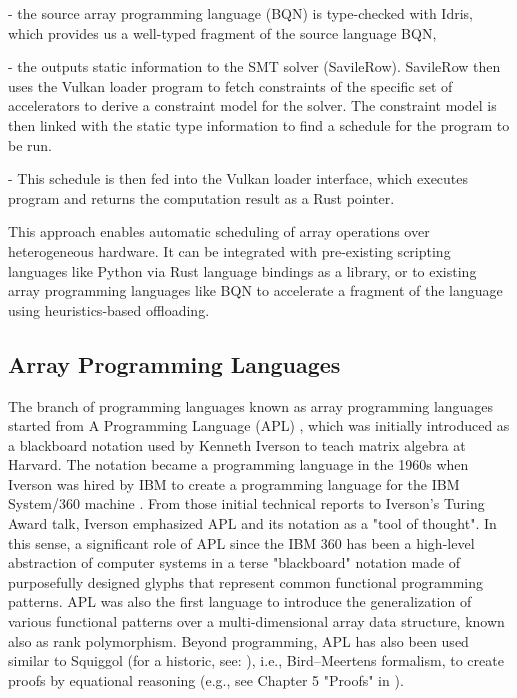 \documentclass[10pt,a4paper]{article}
\begin{document}
- the source array programming language (BQN) is type-checked with Idris, which provides us a well-typed fragment of the source language BQN,

- the outputs static information to the SMT solver (SavileRow). SavileRow then uses the Vulkan loader program to fetch constraints of the specific set of accelerators to derive a constraint model for the solver. The constraint model is then linked with the static type information to find a schedule for the program to be run.

- This schedule is then fed into the Vulkan loader interface, which executes program and returns the computation result as a Rust pointer.

This approach enables automatic scheduling of array operations over heterogeneous hardware. It can be integrated with pre-existing scripting languages like Python via Rust language bindings as a library, or to existing array programming languages like BQN to accelerate a fragment of the language using heuristics-based offloading.

\subsection{Array Programming Languages}

The branch of programming languages known as array programming languages started from A Programming Language (APL) \cite{NotationAsATIverso1980}, which was initially introduced as a blackboard notation used by Kenneth Iverson to teach matrix algebra at Harvard.
The notation became a programming language in the 1960s when Iverson was hired by IBM to create a programming language for the IBM System/360 machine \cite{AFormalDescriFalkof1964}.
From those initial technical reports to Iverson's Turing Award talk, Iverson emphasized APL and its notation as a "tool of thought".
In this sense, a significant role of APL since the IBM 360 has been a high-level abstraction of computer systems in a terse "blackboard" notation made of purposefully designed glyphs that represent common functional programming patterns.
APL was also the first language to introduce the generalization of various functional patterns over a multi-dimensional array data structure, known also as rank polymorphism.
Beyond programming, APL has also been used similar to Squiggol (for a historic, see: \cite{TheSchoolOfSGibbon2020}), i.e., Bird–Meertens formalism, to create proofs by equational reasoning (e.g., see Chapter 5 "Proofs" in \cite{NotationAsATIverso1980}).
\end{document}
